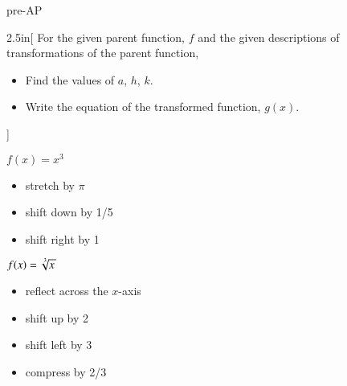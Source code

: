 \begin{taggedblock}{pre-AP}
    \begin{my2Problems}[\large]{2.5in}[%
        For the given parent function, $f$ 
        and the given descriptions of transformations of the parent function,
        \vspace{-1em}
        \begin{itemize}[nosep]
            \item Find the values of $a$, $h$, $k$. 
            \item Write the equation of the transformed function, $g(x)$.
        \end{itemize}
            ]
        {
            $f(x) = x^3$
            \normalsize
            \begin{itemize}[nosep]
                \item stretch by $\pi$
                \item shift down by 1/5
                \item shift right by 1
            \end{itemize}
        }
        {
            $f(x) = \myRoot[3]{x}$
            \normalsize 
            \begin{itemize}[nosep]
                \item reflect across the $x$-axis
                \item shift up by 2
                \item shift left by 3
                \item compress by 2/3%
            \end{itemize}
        }
    \end{my2Problems}
\end{taggedblock}
